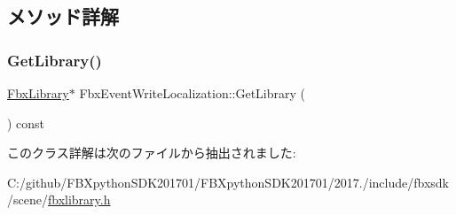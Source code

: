 \subsection{メソッド詳解}
\mbox{\label{class_fbx_event_write_localization_a10110bc0d52be7ba742c5c83c917c40c}} 
\subsubsection{\texorpdfstring{Get\+Library()}{GetLibrary()}}
{\footnotesize\ttfamily \hyperlink{class_fbx_library}{Fbx\+Library}$\ast$ Fbx\+Event\+Write\+Localization\+::\+Get\+Library (\begin{DoxyParamCaption}{ }\end{DoxyParamCaption}) const}



このクラス詳解は次のファイルから抽出されました\+:\begin{DoxyCompactItemize}
\item 
C\+:/github/\+F\+B\+Xpython\+S\+D\+K201701/\+F\+B\+Xpython\+S\+D\+K201701/2017./include/fbxsdk/scene/\hyperlink{fbxlibrary_8h}{fbxlibrary.\+h}\end{DoxyCompactItemize}
